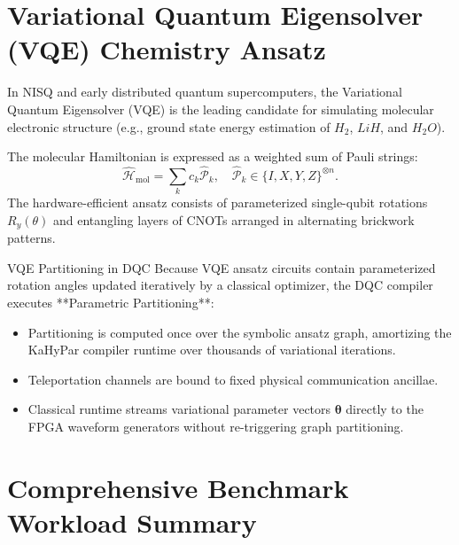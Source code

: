 \section{Variational Quantum Eigensolver (VQE) Chemistry Ansatz}
\label{sec:vqe_chemistry}

In NISQ and early distributed quantum supercomputers, the Variational Quantum Eigensolver (VQE) is the leading candidate for simulating molecular electronic structure (e.g., ground state energy estimation of $H_2$, $LiH$, and $H_2O$).

The molecular Hamiltonian is expressed as a weighted sum of Pauli strings:
\begin{equation}
    \hat{\mathcal{H}}_{\text{mol}} = \sum_{k} c_k \hat{\mathcal{P}}_k, \quad \hat{\mathcal{P}}_k \in \{I, X, Y, Z\}^{\otimes n}.
\end{equation}
The hardware-efficient ansatz consists of parameterized single-qubit rotations $R_y(\theta)$ and entangling layers of CNOTs arranged in alternating brickwork patterns.

\begin{passbox}{VQE Partitioning in DQC}
Because VQE ansatz circuits contain parameterized rotation angles updated iteratively by a classical optimizer, the DQC compiler executes **Parametric Partitioning**:
\begin{itemize}
    \item Partitioning is computed once over the symbolic ansatz graph, amortizing the KaHyPar compiler runtime over thousands of variational iterations.
    \item Teleportation channels are bound to fixed physical communication ancillae.
    \item Classical runtime streams variational parameter vectors $\bm{\theta}$ directly to the FPGA waveform generators without re-triggering graph partitioning.
\end{itemize}
\end{passbox}

\section{Comprehensive Benchmark Workload Summary}
\label{sec:workload_summary}


